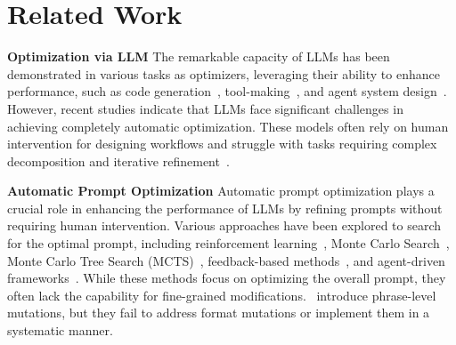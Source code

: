 \section{Related Work}


\noindent \textbf{Optimization via LLM}
The remarkable capacity of LLMs has been demonstrated in various tasks as optimizers, leveraging their ability to enhance performance, such as code generation~\citep{A_2023_optimize_code, C_2024COLM_stop, A_2024_MAGIC}, tool-making~\citep{A_2024_tool_making}, and agent system design~\citep{hu2024automateddesignagenticsystems}. 
However, recent studies indicate that LLMs face significant challenges in achieving completely automatic optimization. These models often rely on human intervention for designing workflows and struggle with tasks requiring complex decomposition and iterative refinement~\citep{A_2024_AFlow,J_2024TMLR_moreagent}.


\noindent \textbf{Automatic Prompt Optimization}
Automatic prompt optimization plays a crucial role in enhancing the performance of LLMs by refining prompts without requiring human intervention. 
Various approaches have been explored to search for the optimal prompt, including reinforcement learning~\citep{C_2023ICLR_TEMPERA}, Monte Carlo Search~\citep{zhou2023ape}, Monte Carlo Tree Search (MCTS)~\citep{C_2024ICLR_promptagent}, feedback-based methods~\citep{C_2023EMNLP_APO, A_2024_GReaTer}, and agent-driven frameworks~\citep{A_2024_LangGPT,C_2024ICLR_DSPy,O_2023_Autogpt}.
While these methods focus on optimizing the overall prompt, they often lack the capability for fine-grained modifications.~\citep{C_2024ICLR_DSPy,C_2024EMNLP_sammo} introduce phrase-level mutations, but they fail to address format mutations or implement them in a systematic manner.



